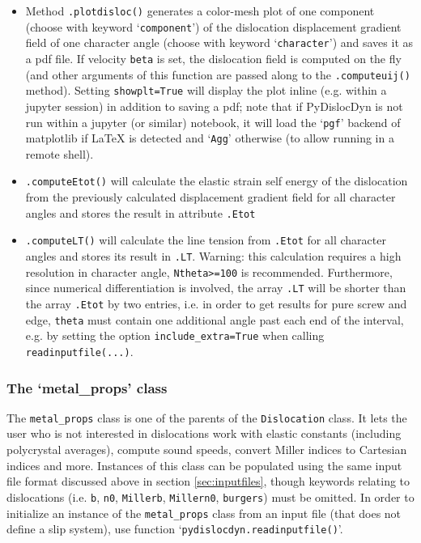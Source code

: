 \documentclass[11pt,letterpaper,oneside]{article}
\begin{document}
\begin{itemize}
\item Method \verb|.plotdisloc()| generates a color-mesh plot of one component (choose with keyword `\verb|component|') of the dislocation displacement gradient field of one character angle (choose with keyword `\verb|character|') and saves it as a pdf file.
If velocity \verb|beta| is set, the dislocation field is computed on the fly (and other arguments of this function are passed along to the \verb|.computeuij()| method).
Setting \verb|showplt=True| will display the plot inline (e.g. within a jupyter session) in addition to saving a pdf;
note that if PyDislocDyn is not run within a jupyter (or similar) notebook, it will load the `\verb|pgf|' backend of matplotlib if  LaTeX is detected and `\verb|Agg|'  otherwise (to allow running in a remote shell).

\item \verb|.computeEtot()| will calculate the elastic strain self energy of the dislocation from the previously calculated displacement gradient field for all character angles and stores the result in attribute \verb|.Etot|

\item \verb|.computeLT()| will calculate the line tension from \verb|.Etot| for all character angles and stores its result in \verb|.LT|.
Warning: this calculation requires a high resolution in character angle, \verb|Ntheta>=100| is recommended.
Furthermore, since numerical differentiation is involved, the array \verb|.LT| will be shorter than the array \verb|.Etot| by two entries, i.e. in order to get results for pure screw and edge, \verb|theta| must contain one additional angle past each end of the interval, e.g. by setting the option \verb|include_extra=True| when calling \verb|readinputfile(...)|.
\end{itemize}


\subsubsection{The `metal\_props' class}
\label{sec:metal_props}

The \verb|metal_props| class is one of the parents of the \verb|Dislocation| class.
It lets the user who is not interested in dislocations work with elastic constants (including polycrystal averages), compute sound speeds, convert Miller indices to Cartesian indices and more.
Instances of this class can be populated using the same input file format discussed above in section \ref{sec:inputfiles}, though keywords relating to dislocations (i.e. \verb|b|, \verb|n0|, \verb|Millerb|, \verb|Millern0|, \verb|burgers|) must be omitted.
In order to initialize an instance of the \verb|metal_props| class from an input file (that does not define a slip system), use function `\verb|pydislocdyn.readinputfile()|'.
\end{document}
